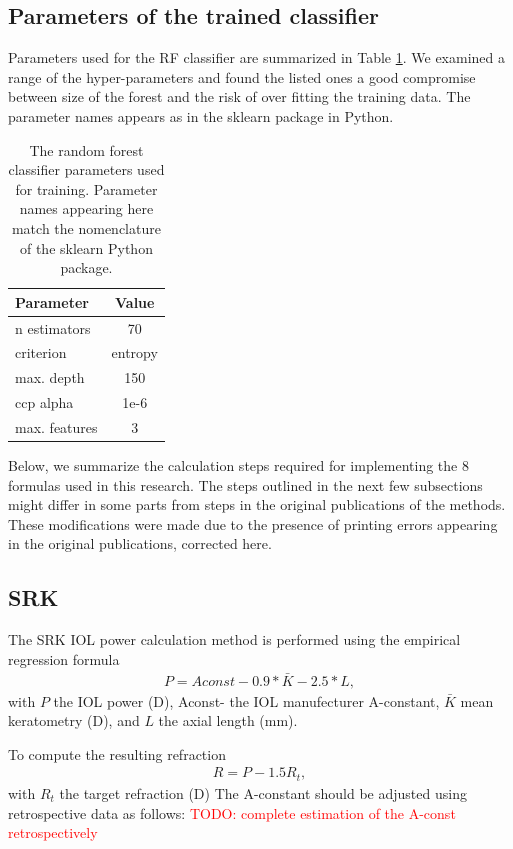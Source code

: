 \documentclass[article,twocolumn,preprint,10pt]{paper}%
\renewcommand{\(}{\left(}
\renewcommand{\)}{\right)}
\renewcommand{\[}{\left[}
\renewcommand{\]}{\right]}
\newcommand{\red}{\textcolor{red}}
\newcommand{\beq}{\begin{eqnarray}}
\newcommand{\eeq}{\end{eqnarray}}
\newcommand{\1}{\mbox{\boldmath$1$}}
\begin{document}
\subsection{Parameters of the trained classifier}\label{subsection:parametersOfClassifier}
Parameters used for the RF classifier are summarized in Table \ref{table:parametersOfTheRFclassifier}. We examined a range of the hyper-parameters and found the listed ones a good compromise between size of the forest and the risk of over fitting the training data. The parameter names appears as in the sklearn package in Python.
\begin{table}
	\begin{tabular}{l|c}
		Parameter     & Value \\
		\hline 
		\hline
		n estimators  & 70 \\
		criterion     & entropy \\
		max. depth    & 150 \\
		ccp alpha     & 1e-6\\
		max. features & 3
	\end{tabular}
\label{table:parametersOfTheRFclassifier}
\caption{The random forest classifier parameters used for training. Parameter names appearing here match the nomenclature of the sklearn Python package.}
\end{table}

Below, we summarize the calculation steps required for implementing the 8 formulas used in this research. The steps outlined in the next few subsections might differ in some parts from steps in the original publications of the methods. These modifications were made due to the presence of printing errors appearing in the original publications, corrected here.

\subsection{SRK}\label{subsection:srk}
The SRK IOL power calculation method is performed using the empirical regression formula
\beq
P = Aconst-0.9*\bar{K}-2.5*L,
\eeq 
with $P$ the IOL power (D), Aconst- the IOL manufecturer A-constant, $\bar{K}$ mean keratometry (D), and $L$ the axial length (mm).

To compute the resulting refraction 
\beq
R = P-1.5R_t,
\eeq 
with $R_t$ the target refraction (D)
The A-constant should be adjusted using retrospective data as follows:
\red{TODO: complete estimation of the A-const retrospectively}
\end{document}
